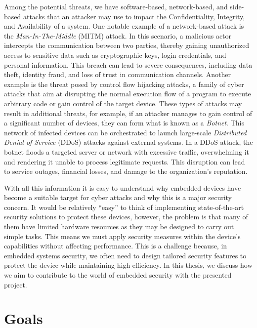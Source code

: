 Among the potential threats, we have software-based, network-based, and side-based
attacks that an attacker may use to impact the Confidentiality, Integrity, and
Availability of a system. One notable example of a network-based attack is the \textit{Man-In-The-Middle}
(MITM) attack. In this scenario, a malicious actor intercepts the communication
between two parties, thereby gaining unauthorized access to sensitive data such as
cryptographic keys, login credentials, and personal information. This breach can
lead to severe consequences, including data theft, identity fraud, and loss of trust
in communication channels. Another example is the threat posed by control flow
hijacking attacks, a family of cyber attacks that aim at disrupting the normal execution
flow of a program to execute arbitrary code or gain control of the target device.
These types of attacks may result in additional threats, for example, if an
attacker manages to gain control of a significant number of devices, they can form
what is known as a \textit{Botnet}. This network of infected devices can be orchestrated
to launch large-scale \textit{Distributed Denial of Service} (DDoS) attacks
against external systems. In a DDoS attack, the botnet floods a targeted server
or network with excessive traffic, overwhelming it and rendering it unable to process
legitimate requests. This disruption can lead to service outages, financial losses,
and damage to the organization's reputation.

With all this information it is easy to understand why embedded devices have
become a suitable target for cyber attacks and why this is a major security
concern. It would be relatively ``easy'' to think of implementing state-of-the-art
security solutions to protect these devices, however, the problem is that many of
them have limited hardware resources as they may be designed to carry out simple
tasks. This means we must apply security measures within the device's
capabilities without affecting performance. This is a challenge because, in
embedded systems security, we often need to design tailored security features to
protect the device while maintaining high efficiency. In this thesis, we discuss
how we aim to contribute to the world of embedded security with the presented project.

\section{Goals}
\label{sec:intro_goals}

